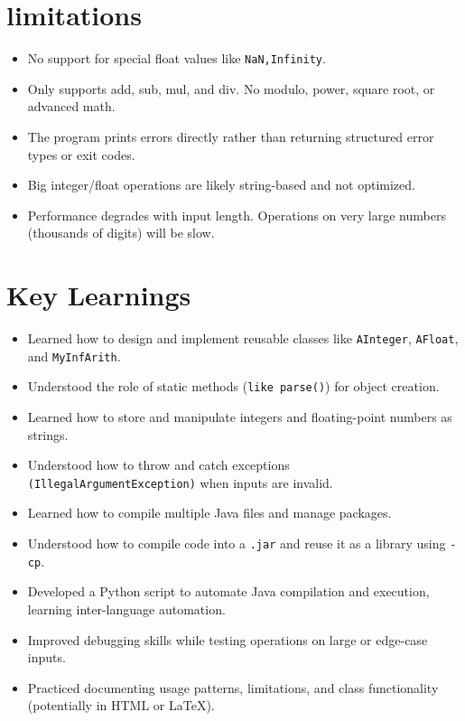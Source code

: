 \documentclass{article}
\begin{document}
    \section*{limitations}
    \begin{itemize}
        \item No support for special float values like \texttt{NaN,Infinity}.
        \item Only supports add, sub, mul, and div. No modulo, power, square root, or advanced math.
        \item The program prints errors directly rather than returning structured error types or exit codes.
        \item Big integer/float operations are likely string-based and not optimized.
        \item Performance degrades with input length. Operations on very large numbers (thousands of digits) will be slow.
    \end{itemize}
    \section*{Key Learnings}
    \begin{itemize}
        \item Learned how to design and implement reusable classes like \texttt{AInteger}, \texttt{AFloat}, and \texttt{MyInfArith}.
        \item Understood the role of static methods (\texttt{like parse()}) for object creation.
        \item Learned how to store and manipulate integers and floating-point numbers as strings.
        \item Understood how to throw and catch exceptions \texttt{(IllegalArgumentException)} when inputs are invalid.
        \item Learned how to compile multiple Java files and manage packages.
        \item Understood how to compile code into a \texttt{.jar} and reuse it as a library using \texttt{-cp}.
        \item Developed a Python script to automate Java compilation and execution, learning inter-language automation.
        \item Improved debugging skills while testing operations on large or edge-case inputs.
        \item Practiced documenting usage patterns, limitations, and class functionality (potentially in HTML or LaTeX).
    \end{itemize}
\end{document}
